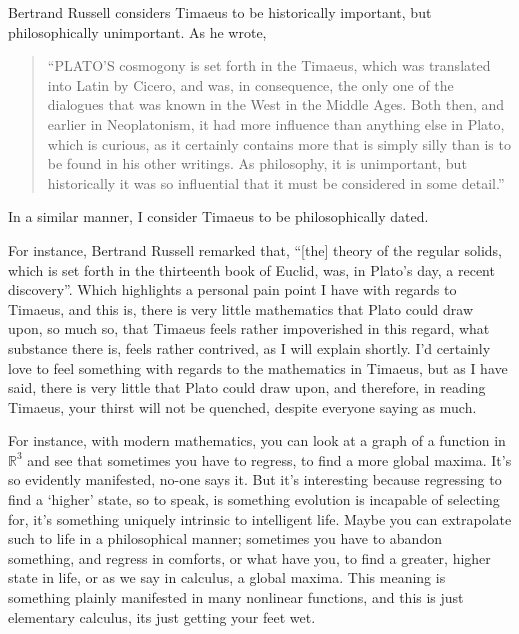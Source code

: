 Bertrand Russell considers Timaeus to be historically important, but philosophically unimportant. As he wrote,

\begin{quotation}
    ``PLATO'S cosmogony is set forth in the Timaeus, which was translated into Latin by Cicero, and was, in consequence, the only one of the dialogues that was known in the West in the Middle Ages. Both then, and earlier in Neoplatonism, it had more influence than anything else in Plato, which is curious, as it certainly contains more that is simply silly than is to be found in his other writings. As philosophy, it is unimportant, but historically it was so influential that it must be considered in some detail.''
\end{quotation}

In a similar manner, I consider Timaeus to be philosophically dated.

For instance, Bertrand Russell remarked that, “[the] theory of the regular solids, which is set forth in the thirteenth book of Euclid, was, in Plato's day, a recent discovery”. Which highlights a personal pain point I have with regards to Timaeus, and this is, there is very little mathematics that Plato could draw upon, so much so, that Timaeus feels rather impoverished in this regard, what substance there is, feels rather contrived, as I will explain shortly. I’d certainly love to feel something with regards to the mathematics in Timaeus, but as I have said, there is very little that Plato could draw upon, and therefore, in reading Timaeus, your thirst will not be quenched, despite everyone saying as much. 

For instance, with modern mathematics, you can look at a graph of a function in $\mathbb{R}^3$ and see that sometimes you have to regress, to find a more global maxima. It’s so evidently manifested, no-one says it. But it’s interesting because regressing to find a ‘higher’ state, so to speak, is something evolution is incapable of selecting for, it’s something uniquely intrinsic to intelligent life. Maybe you can extrapolate such to life in a philosophical manner; sometimes you have to abandon something, and regress in comforts, or what have you, to find a greater, higher state in life, or as we say in calculus, a global maxima. This meaning is something plainly manifested in many nonlinear functions, and this is just elementary calculus, its just getting your feet wet. 

